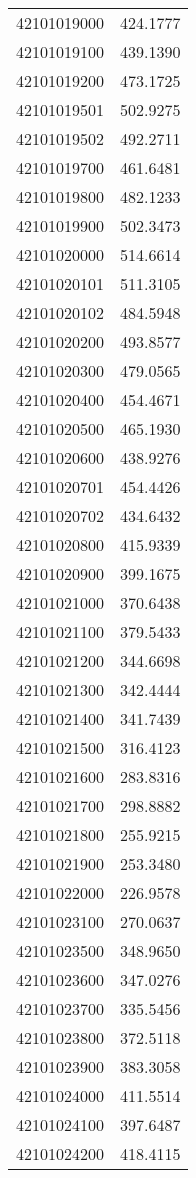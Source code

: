 \begin{longtable}[t]{lr}
42101019000 & 424.1777\\
42101019100 & 439.1390\\
42101019200 & 473.1725\\
42101019501 & 502.9275\\
42101019502 & 492.2711\\
42101019700 & 461.6481\\
42101019800 & 482.1233\\
42101019900 & 502.3473\\
42101020000 & 514.6614\\
42101020101 & 511.3105\\
42101020102 & 484.5948\\
42101020200 & 493.8577\\
42101020300 & 479.0565\\
42101020400 & 454.4671\\
42101020500 & 465.1930\\
42101020600 & 438.9276\\
42101020701 & 454.4426\\
42101020702 & 434.6432\\
42101020800 & 415.9339\\
42101020900 & 399.1675\\
42101021000 & 370.6438\\
42101021100 & 379.5433\\
42101021200 & 344.6698\\
42101021300 & 342.4444\\
42101021400 & 341.7439\\
42101021500 & 316.4123\\
42101021600 & 283.8316\\
42101021700 & 298.8882\\
42101021800 & 255.9215\\
42101021900 & 253.3480\\
42101022000 & 226.9578\\
42101023100 & 270.0637\\
42101023500 & 348.9650\\
42101023600 & 347.0276\\
42101023700 & 335.5456\\
42101023800 & 372.5118\\
42101023900 & 383.3058\\
42101024000 & 411.5514\\
42101024100 & 397.6487\\
42101024200 & 418.4115\\

\end{longtable}
